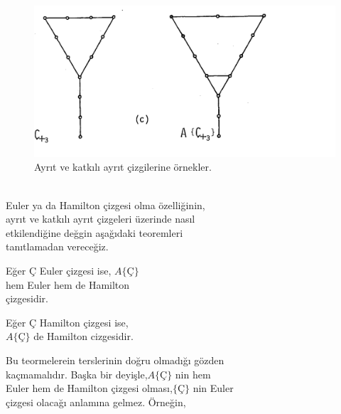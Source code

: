 \documentclass[11pt]{amsbook}
\begin{document}
\begin{figure}[htb]
	\centering
	

	\includegraphics[keepaspectratio=true,scale=0.4]{images/ceyhun-103-fig01}
	\caption{Ayrıt ve katkılı ayrıt çizgilerine örnekler.}
\end{figure}
\\
Euler ya da Hamilton çizgesi olma özelliğinin,\\
ayrıt ve katkılı ayrıt çizgeleri üzerinde nasıl\\
etkilendiğine değgin aşağıdaki teoremleri\\
tanıtlamadan vereceğiz.\\
\begin{theorem}
Eğer $Ç$ Euler çizgesi ise, $A \{Ç\}$\\
hem Euler hem de Hamilton\\
çizgesidir.\\
\end{theorem}
\begin{theorem}
Eğer $Ç$ Hamilton çizgesi ise,\\
$A\{Ç\}$ de Hamilton cizgesidir.\\
\end{theorem}

Bu teormelerein terslerinin doğru olmadığı gözden\\
kaçmamalıdır. Başka bir deyişle,$A\{Ç\}$ nin hem\\
Euler hem de Hamilton çizgesi olması,$\{Ç\}$ nin Euler\\
çizgesi olacağı anlamına gelmez. Örneğin,\\
\end{document}
